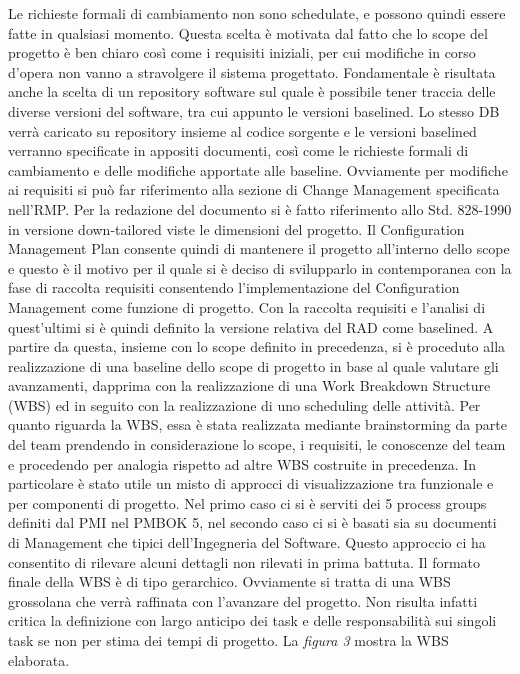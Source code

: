 Le richieste formali di cambiamento non sono schedulate, e possono quindi essere fatte in qualsiasi momento. Questa scelta è motivata dal fatto che lo scope del progetto è ben chiaro così come i requisiti iniziali, per cui modifiche in corso d’opera non vanno a stravolgere il sistema progettato.
Fondamentale è risultata anche la scelta di un repository software sul quale è possibile tener traccia delle diverse versioni del software, tra cui appunto le versioni baselined. Lo stesso DB verrà caricato su repository insieme al codice sorgente e le versioni baselined verranno specificate in appositi documenti, così come le richieste formali di cambiamento e delle modifiche apportate alle baseline.
Ovviamente per modifiche ai requisiti si può far riferimento alla sezione di Change Management specificata nell’RMP.
Per la redazione del documento si è fatto riferimento allo Std. 828-1990 in versione down-tailored viste le dimensioni del progetto.
Il Configuration Management Plan consente quindi di mantenere il progetto all’interno dello scope e questo è il motivo per il quale si è deciso di svilupparlo in contemporanea con la fase di raccolta requisiti consentendo l’implementazione del Configuration Management come funzione di progetto.
Con la raccolta requisiti e l’analisi di quest’ultimi si è quindi definito la versione relativa del RAD come baselined.
A partire da questa, insieme con lo scope definito in precedenza, si è proceduto alla realizzazione di una baseline dello scope di progetto in base al quale valutare gli avanzamenti, dapprima con la realizzazione di una Work Breakdown Structure (WBS) ed in seguito con la realizzazione di uno scheduling delle attività.
Per quanto riguarda la WBS, essa è stata realizzata mediante brainstorming da parte del team prendendo in considerazione lo scope, i requisiti, le conoscenze del team e procedendo per analogia rispetto ad altre WBS costruite in precedenza.
In particolare è stato utile un misto di approcci di visualizzazione tra funzionale e per componenti di progetto. Nel primo caso ci si è serviti dei 5 process groups definiti dal PMI nel PMBOK 5, nel secondo caso ci si è basati sia su documenti di Management che tipici dell’Ingegneria del Software.
Questo approccio ci ha consentito di rilevare alcuni dettagli non rilevati in prima battuta. 
Il formato finale della WBS è di tipo gerarchico. Ovviamente si tratta di una WBS grossolana che verrà raffinata con l’avanzare del progetto. Non risulta infatti critica la definizione con largo anticipo dei task e delle responsabilità sui singoli task se non per stima dei tempi di progetto.
La \emph{figura 3} mostra la WBS elaborata.

